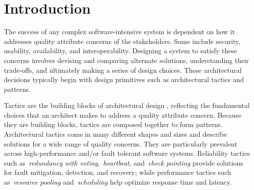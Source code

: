 \documentclass[conference]{IEEEtran}
\begin{document}




%
\IEEEpeerreviewmaketitle



\section{Introduction}
The success of any complex software-intensive system is dependent on how it addresses quality attribute concerns of the stakeholders. Some include security, usability, availability, and interoperability. Designing a system to satisfy these concerns involves devising and comparing alternate solutions, understanding their trade-offs, and ultimately making a series of design choices. These architectural decisions typically begin with design primitives such as architectural tactics and patterns.

Tactics are the building blocks of architectural design \cite{bass:arch12}, reflecting the fundamental choices that an architect makes to address a quality attribute concern. Because they are building blocks, tactics are composed together to form patterns. Architectural tactics come in many different shapes and sizes and describe solutions for a wide range of quality concerns. They are particularly prevalent across high-performance and/or fault tolerant software systems. Reliability tactics such as~\emph{redundancy with voting},~\emph{heartbeat}, and~\emph{check pointing} provide solutions for fault mitigation, detection, and recovery; while performance tactics such as~\emph{resource pooling} and~\emph{scheduling} help optimize response time and latency.
\end{document}
